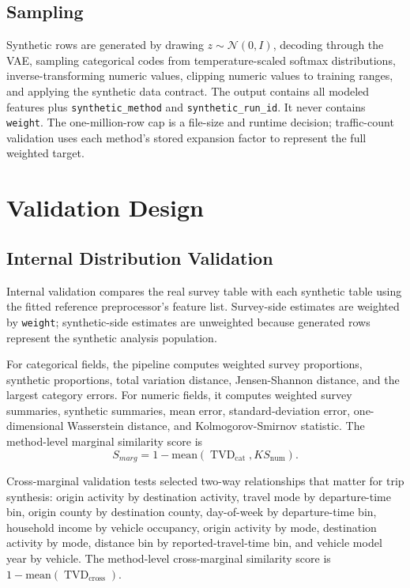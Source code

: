 \documentclass[3p,times,procedia]{elsarticle}
\DeclareMathOperator{\TVD}{TVD}
\begin{document}
\subsection{Sampling}
Synthetic rows are generated by drawing $z\sim\mathcal{N}(0,I)$, decoding through the VAE, sampling categorical codes from temperature-scaled softmax distributions, inverse-transforming numeric values, clipping numeric values to training ranges, and applying the synthetic data contract. The output contains all modeled features plus \texttt{synthetic\_method} and \texttt{synthetic\_run\_id}. It never contains \texttt{weight}. The one-million-row cap is a file-size and runtime decision; traffic-count validation uses each method's stored expansion factor to represent the full weighted target.

\section{Validation Design}\label{sec:validation}
\subsection{Internal Distribution Validation}
Internal validation compares the real survey table with each synthetic table using the fitted reference preprocessor's feature list. Survey-side estimates are weighted by \texttt{weight}; synthetic-side estimates are unweighted because generated rows represent the synthetic analysis population.

For categorical fields, the pipeline computes weighted survey proportions, synthetic proportions, total variation distance, Jensen-Shannon distance, and the largest category errors. For numeric fields, it computes weighted survey summaries, synthetic summaries, mean error, standard-deviation error, one-dimensional Wasserstein distance, and Kolmogorov-Smirnov statistic. The method-level marginal similarity score is
\[
    S_{marg} = 1-\mathrm{mean}\left(\TVD_{\mathrm{cat}}, KS_{\mathrm{num}}\right).
\]

Cross-marginal validation tests selected two-way relationships that matter for trip synthesis: origin activity by destination activity, travel mode by departure-time bin, origin county by destination county, day-of-week by departure-time bin, household income by vehicle occupancy, origin activity by mode, destination activity by mode, distance bin by reported-travel-time bin, and vehicle model year by vehicle. The method-level cross-marginal similarity score is $1-\mathrm{mean}(\TVD_{\mathrm{cross}})$.
\end{document}
